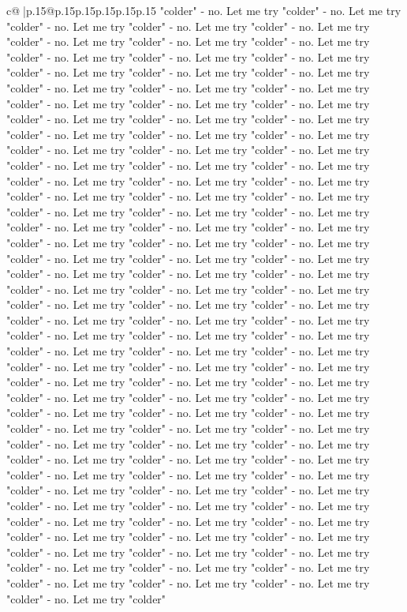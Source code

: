 \documentclass{article}
\begin{document}
{\begin{supertabular}{c@{$\;$}|p{.15\linewidth}@{}p{.15\linewidth}p{.15\linewidth}p{.15\linewidth}p{.15\linewidth}p{.15\linewidth}}
{{{"colder" {-} no. Let me try "colder" {-} no. Let me try "colder" {-} no. Let me try "colder" {-} no. Let me try "colder" {-} no. Let me try "colder" {-} no. Let me try "colder" {-} no. Let me try "colder" {-} no. Let me try "colder" {-} no. Let me try "colder" {-} no. Let me try "colder" {-} no. Let me try "colder" {-} no. Let me try "colder" {-} no. Let me try "colder" {-} no. Let me try "colder" {-} no. Let me try "colder" {-} no. Let me try "colder" {-} no. Let me try "colder" {-} no. Let me try "colder" {-} no. Let me try "colder" {-} no. Let me try "colder" {-} no. Let me try "colder" {-} no. Let me try "colder" {-} no. Let me try "colder" {-} no. Let me try "colder" {-} no. Let me try "colder" {-} no. Let me try "colder" {-} no. Let me try "colder" {-} no. Let me try "colder" {-} no. Let me try "colder" {-} no. Let me try "colder" {-} no. Let me try "colder" {-} no. Let me try "colder" {-} no. Let me try "colder" {-} no. Let me try "colder" {-} no. Let me try "colder" {-} no. Let me try "colder" {-} no. Let me try "colder" {-} no. Let me try "colder" {-} no. Let me try "colder" {-} no. Let me try "colder" {-} no. Let me try "colder" {-} no. Let me try "colder" {-} no. Let me try "colder" {-} no. Let me try "colder" {-} no. Let me try "colder" {-} no. Let me try "colder" {-} no. Let me try "colder" {-} no. Let me try "colder" {-} no. Let me try "colder" {-} no. Let me try "colder" {-} no. Let me try "colder" {-} no. Let me try "colder" {-} no. Let me try "colder" {-} no. Let me try "colder" {-} no. Let me try "colder" {-} no. Let me try "colder" {-} no. Let me try "colder" {-} no. Let me try "colder" {-} no. Let me try "colder" {-} no. Let me try "colder" {-} no. Let me try "colder" {-} no. Let me try "colder" {-} no. Let me try "colder" {-} no. Let me try "colder" {-} no. Let me try "colder" {-} no. Let me try "colder" {-} no. Let me try "colder" {-} no. Let me try "colder" {-} no. Let me try "colder" {-} no. Let me try "colder" {-} no. Let me try "colder" {-} no. Let me try "colder" {-} no. Let me try "colder" {-} no. Let me try "colder" {-} no. Let me try "colder" {-} no. Let me try "colder" {-} no. Let me try "colder" {-} no. Let me try "colder" {-} no. Let me try "colder" {-} no. Let me try "colder" {-} no. Let me try "colder" {-} no. Let me try "colder" {-} no. Let me try "colder" {-} no. Let me try "colder" {-} no. Let me try "colder" {-} no. Let me try "colder" {-} no. Let me try "colder" {-} no. Let me try "colder" {-} no. Let me try "colder" {-} no. Let me try "colder" {-} no. Let me try "colder" {-} no. Let me try "colder" {-} no. Let me try "colder" {-} no. Let me try "colder" {-} no. Let me try "colder" {-} no. Let me try "colder" {-} no. Let me try "colder" {-} no. Let me try "colder" {-} no. Let me try "colder" {-} no. Let me try "colder" {-} no. Let me try "colder" {-} no. Let me try "colder" {-} no. Let me try "colder" {-} no. Let me try "colder" {-} no. Let me try "colder" {-} no. Let me try "colder" {-} no. Let me try "colder" {-} no. Let me try "colder" {-} no. Let me try "colder" {-} no. Let me try "colder" {-} no. Let me try "colder" {-} no. Let me try "colder" {-} no. Let me try "colder" {-} no. Let me try "colder" }}}
\end{supertabular}}
\end{document}
